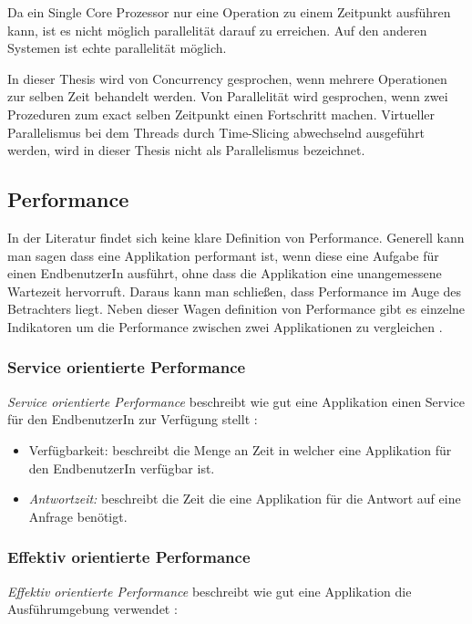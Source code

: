 Da ein Single Core Prozessor nur eine Operation zu einem Zeitpunkt ausführen kann, ist es nicht möglich parallelität darauf zu erreichen. Auf den anderen Systemen ist echte parallelität möglich.  

In dieser Thesis wird von Concurrency gesprochen, wenn mehrere Operationen zur selben Zeit behandelt werden.  Von Parallelität wird gesprochen, wenn zwei Prozeduren zum exact selben Zeitpunkt einen Fortschritt machen. Virtueller Parallelismus bei dem Threads durch Time-Slicing abwechselnd ausgeführt werden, wird in dieser Thesis nicht als Parallelismus bezeichnet.

\subsection{Performance}

In der Literatur findet sich keine klare Definition von Performance. Generell kann man sagen dass eine Applikation performant ist, wenn diese eine Aufgabe für einen EndbenutzerIn ausführt, ohne dass die Applikation eine unangemessene Wartezeit hervorruft. Daraus kann man schließen, dass Performance im Auge des Betrachters liegt. Neben dieser Wagen definition von Performance gibt es einzelne Indikatoren um die Performance zwischen zwei Applikationen zu vergleichen \cite[p. 2]{Mol2009}. 

\subsubsection{Service orientierte Performance}

\emph{Service orientierte Performance} beschreibt wie gut eine Applikation einen Service für den EndbenutzerIn zur Verfügung stellt \cite[p. 2]{Mol2009}:

\begin{itemize}
  \item {Verfügbarkeit:} beschreibt die Menge an Zeit in welcher eine Applikation für den EndbenutzerIn verfügbar ist.
  \item \emph{Antwortzeit:} beschreibt die Zeit die eine Applikation für die Antwort auf eine Anfrage benötigt.
\end{itemize}


\subsubsection{Effektiv orientierte Performance}

\emph{Effektiv orientierte Performance} beschreibt wie gut eine Applikation die Ausführumgebung verwendet \cite[p. 2]{Mol2009}:

